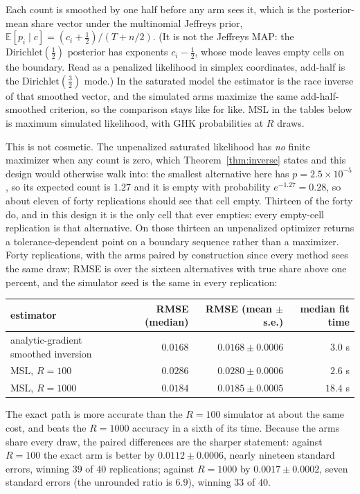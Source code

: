 \documentclass[11pt]{article}
\begin{document}
Each count is smoothed by one half before any arm sees it, which is the
posterior-mean share vector under the multinomial Jeffreys prior,
$\mathbb{E}[p_i\mid c]=(c_i+\tfrac12)/(T+n/2)$. (It is not the Jeffreys
MAP: the $\mathrm{Dirichlet}(\tfrac12)$ posterior has exponents
$c_i-\tfrac12$, whose mode leaves empty cells on the boundary. Read as a
penalized likelihood in simplex coordinates, add-half is the
$\mathrm{Dirichlet}(\tfrac32)$ mode.) In the saturated model the estimator
is the race inverse of that smoothed vector, and the simulated arms
maximize the same add-half-smoothed criterion, so the comparison stays
like for like. MSL in the tables below is maximum simulated
likelihood, with GHK probabilities at $R$ draws.

This is not cosmetic. The unpenalized saturated likelihood has \emph{no}
finite maximizer when any count is zero, which Theorem~\ref{thm:inverse}
states and this design would otherwise walk into: the smallest
alternative here has $p=2.5\times10^{-5}$, so its expected count is
$1.27$ and it is empty with probability $e^{-1.27}=0.28$, so about
eleven of forty replications should see that cell empty. Thirteen of the
forty do, and in this design it is the only cell that ever empties: every
empty-cell replication is that alternative. On those thirteen an
unpenalized optimizer returns a tolerance-dependent point on a boundary
sequence rather than a maximizer. Forty replications, with the arms paired by construction
since every method sees the same draw; RMSE is over the sixteen alternatives
with true share above one percent, and the simulator seed is the same in
every replication:

\begin{center}\small
\begin{tabular}{lrrr}
\toprule
estimator & RMSE (median) & RMSE (mean $\pm$ s.e.) & median fit time \\
\midrule
analytic-gradient smoothed inversion & $0.0168$ & $0.0168\pm0.0006$ & $3.0$ s \\
MSL, $R=100$ & $0.0286$ & $0.0280\pm0.0006$ & $2.6$ s \\
MSL, $R=1000$ & $0.0184$ & $0.0185\pm0.0005$ & $18.4$ s \\
\bottomrule
\end{tabular}
\end{center}

\noindent The exact path is more accurate than the $R=100$ simulator at
about the same cost, and beats the $R=1000$ accuracy in a sixth of its
time. Because the arms share every draw, the paired differences
are the sharper statement: against $R=100$ the exact arm is better by
$0.0112\pm0.0006$, nearly nineteen standard errors, winning $39$ of $40$
replications; against $R=1000$ by $0.0017\pm0.0002$, seven standard
errors (the unrounded ratio is $6.9$), winning $33$ of $40$.
\end{document}
